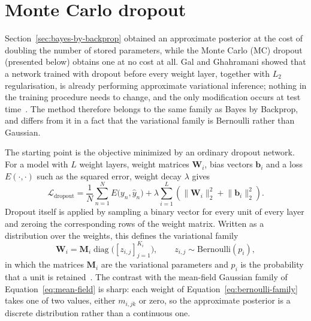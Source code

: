 \section{Monte Carlo dropout}
\label{sec:mc-dropout}

Section~\ref{sec:bayes-by-backprop} obtained an approximate posterior at the cost
of doubling the number of stored parameters, while the Monte Carlo (MC) dropout (presented below) obtains one at no cost at all. Gal and Ghahramani showed that a network trained with dropout
before every weight layer, together with $L_2$ regularisation, is already performing approximate variational inference; nothing in the training procedure needs to change, and the only modification occurs at test time~\cite{gal2016}. The method therefore belongs to the same family as Bayes by Backprop, and differs from it in a fact that the variational family is
Bernoulli rather than Gaussian.

The starting point is the objective minimized by an ordinary dropout network. For
a model with $L$ weight layers, weight matrices $\mathbf{W}_i$, bias vectors
$\mathbf{b}_i$ and a loss $E(\cdot,\cdot)$ such as the squared error, weight decay
$\lambda$ gives
%
\begin{equation}
    \mathcal{L}_{\mathrm{dropout}}
    = \frac{1}{N} \sum_{n=1}^{N} E\bigl(y_n, \hat{y}_n\bigr)
      + \lambda \sum_{i=1}^{L}
        \left( \lVert \mathbf{W}_i \rVert_2^2
             + \lVert \mathbf{b}_i \rVert_2^2 \right) .
    \label{eq:dropout-objective}
\end{equation}
%
Dropout itself is applied by sampling a binary vector for every unit of every
layer and zeroing the corresponding rows of the weight matrix. Written as a
distribution over the weights, this defines the variational family
%
\begin{equation}
    \mathbf{W}_i = \mathbf{M}_i \operatorname{diag}
      \bigl( [z_{i,j}]_{j=1}^{K_i} \bigr),
    \qquad
    z_{i,j} \sim \mathrm{Bernoulli}(p_i) ,
    \label{eq:bernoulli-family}
\end{equation}
%
in which the matrices $\mathbf{M}_i$ are the variational parameters and $p_i$ is
the probability that a unit is retained~\cite{gal2016}. The contrast with the
mean-field Gaussian family of Equation~\eqref{eq:mean-field} is sharp: each weight
of Equation~\eqref{eq:bernoulli-family} takes one of two values, either $m_{i,jk}$
or zero, so the approximate posterior is a discrete distribution rather than a
continuous one.

